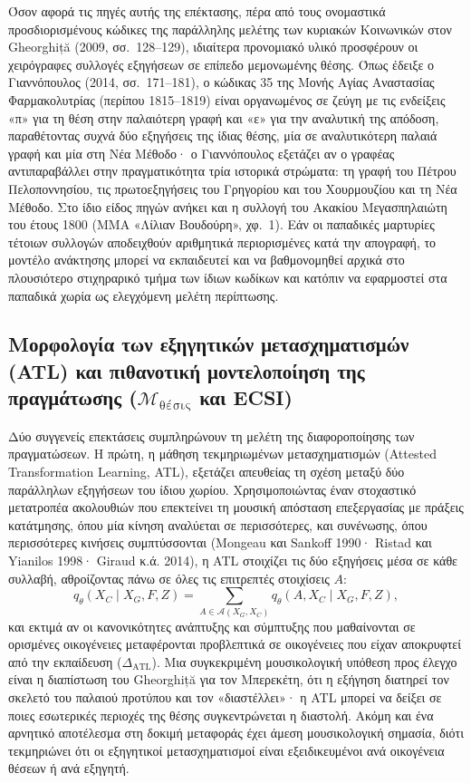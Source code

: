 \documentclass[11pt,a4paper]{article}
\newcommand{\Mth}{\mathcal{M}_{\text{θέσις}}}
\begin{document}
Όσον αφορά τις πηγές αυτής της επέκτασης, πέρα από τους ονομαστικά προσδιορισμένους κώδικες της παράλληλης μελέτης των κυριακών Κοινωνικών στον Gheorghiță (2009, σσ.~128--129), ιδιαίτερα προνομιακό υλικό προσφέρουν οι χειρόγραφες συλλογές εξηγήσεων σε επίπεδο μεμονωμένης θέσης. Όπως έδειξε ο Γιαννόπουλος (2014, σσ.~171--181), ο κώδικας 35 της Μονής Αγίας Αναστασίας Φαρμακολυτρίας (περίπου 1815--1819) είναι οργανωμένος σε ζεύγη με τις ενδείξεις «π» για τη θέση στην παλαιότερη γραφή και «ε» για την αναλυτική της απόδοση, παραθέτοντας συχνά δύο εξηγήσεις της ίδιας θέσης, μία σε αναλυτικότερη παλαιά γραφή και μία στη Νέα Μέθοδο· ο Γιαννόπουλος εξετάζει αν ο γραφέας αντιπαραβάλλει στην πραγματικότητα τρία ιστορικά στρώματα: τη γραφή του Πέτρου Πελοποννησίου, τις πρωτοεξηγήσεις του Γρηγορίου και του Χουρμουζίου και τη Νέα Μέθοδο. Στο ίδιο είδος πηγών ανήκει και η συλλογή του Ακακίου Μεγασπηλαιώτη του έτους 1800 (ΜΜΑ «Λίλιαν Βουδούρη», χφ.~1). Εάν οι παπαδικές μαρτυρίες τέτοιων συλλογών αποδειχθούν αριθμητικά περιορισμένες κατά την απογραφή, το μοντέλο ανάκτησης μπορεί να εκπαιδευτεί και να βαθμονομηθεί αρχικά στο πλουσιότερο στιχηραρικό τμήμα των ίδιων κωδίκων και κατόπιν να εφαρμοστεί στα παπαδικά χωρία ως ελεγχόμενη μελέτη περίπτωσης.

\subsection{Μορφολογία των εξηγητικών μετασχηματισμών (ATL) και πιθανοτική μοντελοποίηση της πραγμάτωσης ($\Mth$ και ECSI)}

Δύο συγγενείς επεκτάσεις συμπληρώνουν τη μελέτη της διαφοροποίησης των πραγματώσεων. Η πρώτη, η μάθηση τεκμηριωμένων μετασχηματισμών (Attested Transformation Learning, ATL), εξετάζει απευθείας τη σχέση μεταξύ δύο παράλληλων εξηγήσεων του ίδιου χωρίου. Χρησιμοποιώντας έναν στοχαστικό μετατροπέα ακολουθιών που επεκτείνει τη μουσική απόσταση επεξεργασίας με πράξεις κατάτμησης, όπου μία κίνηση αναλύεται σε περισσότερες, και συνένωσης, όπου περισσότερες κινήσεις συμπτύσσονται (Mongeau και Sankoff 1990· Ristad και Yianilos 1998· Giraud κ.ά. 2014), η ATL στοιχίζει τις δύο εξηγήσεις μέσα σε κάθε συλλαβή, αθροίζοντας πάνω σε όλες τις επιτρεπτές στοιχίσεις $A$:
\[
q_\theta(X_C\mid X_G,F,Z)=\sum_{A\in\mathcal A(X_G,X_C)}q_\theta(A,X_C\mid X_G,F,Z),
\]
και εκτιμά αν οι κανονικότητες ανάπτυξης και σύμπτυξης που μαθαίνονται σε ορισμένες οικογένειες μεταφέρονται προβλεπτικά σε οικογένειες που είχαν αποκρυφτεί από την εκπαίδευση ($\Delta_{\text{ATL}}$). Μια συγκεκριμένη μουσικολογική υπόθεση προς έλεγχο είναι η διαπίστωση του Gheorghiță για τον Μπερεκέτη, ότι η εξήγηση διατηρεί τον σκελετό του παλαιού προτύπου και τον «διαστέλλει»· η ATL μπορεί να δείξει σε ποιες εσωτερικές περιοχές της θέσης συγκεντρώνεται η διαστολή. Ακόμη και ένα αρνητικό αποτέλεσμα στη δοκιμή μεταφοράς έχει άμεση μουσικολογική σημασία, διότι τεκμηριώνει ότι οι εξηγητικοί μετασχηματισμοί είναι εξειδικευμένοι ανά οικογένεια θέσεων ή ανά εξηγητή.
\end{document}

